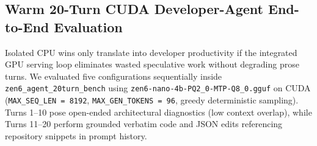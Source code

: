 \documentclass[11pt,a4paper]{article}
\begin{document}
\begin{table}[ht]
\centering
{}
\caption{Production tokenizer evaluation ($32{,}770\,\text{B}$ single-shot + $3{,}599\,\text{B}$ 20-turn incremental chat, 100\% exact token-ID parity with Hugging Face \texttt{tokenizers 0.21.4}).}
\label{tab:tok_real}
\end{table}

\subsection{Warm 20-Turn CUDA Developer-Agent End-to-End Evaluation}

Isolated CPU wins only translate into developer productivity if the integrated GPU serving loop eliminates wasted speculative work without degrading prose turns. We evaluated five configurations sequentially inside \texttt{zen6\_agent\_20turn\_bench} using \texttt{zen6-nano-4b-PQ2\_0-MTP-Q8\_0.gguf} on CUDA (\texttt{MAX\_SEQ\_LEN = 8192}, \texttt{MAX\_GEN\_TOKENS = 96}, greedy deterministic sampling). Turns 1--10 pose open-ended architectural diagnostics (low context overlap), while Turns 11--20 perform grounded verbatim code and JSON edits referencing repository snippets in prompt history.
\end{document}
